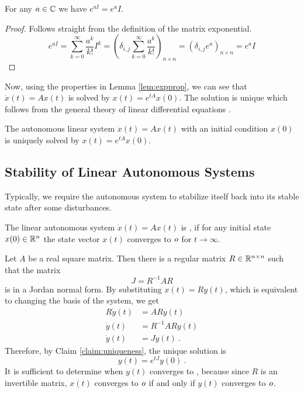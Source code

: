 \begin{lemma}
	\label{lem:matrixExpIdentity}
	For any $a\in\mathbb{C}$ we have $e^{a I}=e^{a}I$.
\end{lemma}

\begin{proof}
	Follows straight from the definition of the matrix exponential.
	$$e^{a I}=\sum^\infty_{k=0}\frac{a^k}{k!}I^k=\left(\delta_{i,j}\sum^\infty_{k=0}\frac{a^k}{k!}\right)_{n\times n}=\left(\delta_{i,j}e^a\right)_{n\times n}=e^aI$$
\end{proof}

Now, using the properties in Lemma \ref{lem:expprop}, we can see that $\dot{x}(t)=Ax(t)$ is solved by $x(t)=e^{tA}x(0)$. The solution is unique which follows from the general theory of linear differential equations \cite[see][Věta 13.5.1]{Pick}.

\begin{claim}
\label{claim:uniqueness}
	The autonomous linear system $\dot{x}(t)=Ax(t)$ with an initial condition $x(0)$ is uniquely solved by $x(t)=e^{tA}x(0)$.
\end{claim}

\subsection{Stability of Linear Autonomous Systems}

Typically, we require the autonomous system to stabilize itself back into its stable state after some disturbances.

\begin{definition}
	The linear autonomous system $\dot{x}(t)=Ax(t)$ is , if for any initial state $x(0)\in\mathbb{R}^n$ the state vector $x(t)$ converges to $\textit{o}$ for $t\to\infty$.
\end{definition}

Let $A$ be a real square matrix. Then there is a regular matrix $R\in \mathbb{R}^{n\times n}$ such that the matrix
$$J=R^{-1}AR$$
is in a Jordan normal form. By substituting $x(t)=Ry(t)$, which is equivalent to changing the basis of the system, we get 
\begin{align*}
	R\dot{y}(t)&=ARy(t) \\
	\dot{y}(t)&=R^{-1}ARy(t) \\
	\dot{y}(t)&=Jy(t)\ .
\end{align*}
Therefore, by Claim \ref{claim:uniqueness}, the unique solution is
$$y(t)=e^{tJ}y(0)\ .$$
It is sufficient to determine when $y(t)$ converges to \nullvector, because since $R$ is an invertible matrix, $x(t)$ converges to $\textit{o}$ if and only if $y(t)$ converges to $\textit{o}$.

